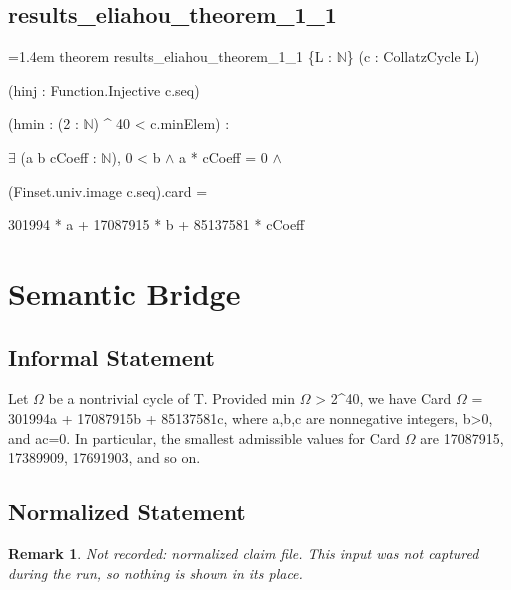 \documentclass[11pt]{article}
\newtheorem{remark}[theorem]{Remark}
\begin{document}
\subsection*{results\_eliahou\_theorem\_1\_1}
{\footnotesize\ttfamily\raggedright\hangindent=1.4em\noindent
\hspace*{0.00em}theorem results\_\allowbreak{}eliahou\_\allowbreak{}theorem\_\allowbreak{}1\_\allowbreak{}1 \{L : \ensuremath{\mathbb{N}}\} (c : CollatzCycle L)\par
\hspace*{2.20em}(hinj : Function.\allowbreak{}Injective c.\allowbreak{}seq)\par
\hspace*{2.20em}(hmin : (2 : \ensuremath{\mathbb{N}}) \textasciicircum{} 40 < c.\allowbreak{}minElem) :\par
\hspace*{2.20em}\ensuremath{\exists} (a b cCoeff : \ensuremath{\mathbb{N}}), 0 < b \ensuremath{\wedge} a * cCoeff = 0 \ensuremath{\wedge}\par
\hspace*{3.30em}(Finset.\allowbreak{}univ.\allowbreak{}image c.\allowbreak{}seq).\allowbreak{}card =\par
\hspace*{4.40em}301994 * a + 17087915 * b + 85137581 * cCoeff\par
}

\section{Semantic Bridge}
\subsection*{Informal Statement}
Let \ensuremath{\Omega} be a nontrivial cycle of T. Provided min \ensuremath{\Omega} > 2\textasciicircum{}40, we have Card \ensuremath{\Omega} = 301994a + 17087915b + 85137581c, where a,b,c are nonnegative integers, b>0, and ac=0. In particular, the smallest admissible values for Card \ensuremath{\Omega} are 17087915, 17389909, 17691903, and so on.
\subsection*{Normalized Statement}
\begin{remark}\textit{Not recorded: normalized claim file.} This input was not captured during the run, so nothing is shown in its place.\end{remark}
\end{document}
